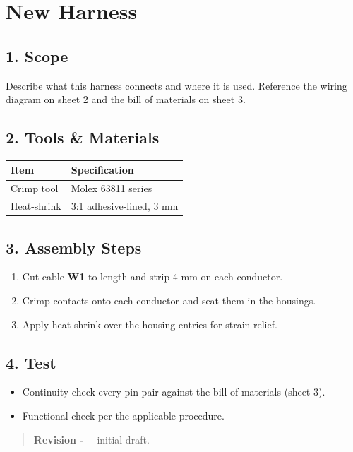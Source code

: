 \hypertarget{new-harness}{%
\section{New Harness}\label{new-harness}}

\hypertarget{1-scope}{%
\subsection{1. Scope}\label{1-scope}}

Describe what this harness connects and where it is used. Reference the wiring diagram on sheet 2 and the bill of materials on sheet 3.

\hypertarget{2-tools--materials}{%
\subsection{2. Tools \& Materials}\label{2-tools--materials}}

\begin{longtable}[]{@{}ll@{}}
\toprule
Item & Specification\tabularnewline
\midrule
\endhead
Crimp tool & Molex 63811 series\tabularnewline
Heat-shrink & 3:1 adhesive-lined, 3 mm\tabularnewline
\bottomrule
\end{longtable}

\hypertarget{3-assembly-steps}{%
\subsection{3. Assembly Steps}\label{3-assembly-steps}}

\begin{enumerate}
\def\labelenumi{\arabic{enumi}.}
\tightlist
\item
  Cut cable \textbf{W1} to length and strip 4 mm on each conductor.
\item
  Crimp contacts onto each conductor and seat them in the housings.
\item
  Apply heat-shrink over the housing entries for strain relief.
\end{enumerate}

\hypertarget{4-test}{%
\subsection{4. Test}\label{4-test}}

\begin{itemize}
\tightlist
\item
  Continuity-check every pin pair against the bill of materials (sheet 3).
\item
  Functional check per the applicable procedure.
\end{itemize}

\begin{quote}
\textbf{Revision -} -\/- initial draft.
\end{quote}
